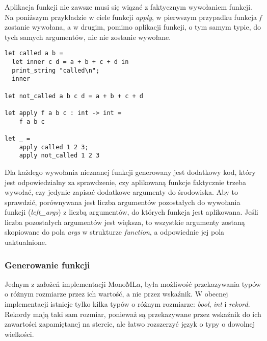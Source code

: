 \documentclass[declaration,shortabstract]{iithesis}
\begin{document}
Aplikacja funkcji nie zawsze musi się wiązać z faktycznym wywołaniem funkcji.
Na poniższym przykładzie w ciele funkcji \textit{apply},
w pierwszym przypadku funkcja \textit{f} zostanie wywołana, 
a w drugim, pomimo aplikacji funkcji, o tym samym typie, do tych samych 
argumentów, nic nie zostanie wywołane.
\begin{lstlisting}[frame=single, caption={To czy funkcja zostanie wywołana,
nie jest wiadome w czasie kompilacj. OCaml.}]
let called a b = 
  let inner c d = a + b + c + d in 
  print_string "called\n";
  inner 

let not_called a b c d = a + b + c + d 

let apply f a b c : int -> int = 
    f a b c 

let _ = 
    apply called 1 2 3;
    apply not_called 1 2 3
\end{lstlisting}

Dla każdego wywołania nieznanej funkcji generowany jest dodatkowy \newline
kod, który jest odpowiedzialny za sprawdzenie, czy aplikowaną funkcje 
faktycznie trzeba wywołać, czy jedynie zapisać dodatkowe argumenty do 
środowiska. Aby to sprawdzić, porównywana jest liczba argumentów pozostałych do 
wywołania funkcji (\textit{left\_args}) z liczbą argumentów, do których 
funkcja jest aplikowana.
Jeśli liczba pozostałych argumentów jest większa, to wszystkie argumenty 
zostaną skopiowane do pola \textit{args} w strukturze \textit{function}, a 
odpowiednie jej pola uaktualnione.










\subsubsection{Generowanie funkcji}

Jednym z założeń implementacji MonoMLa, była możliwość przekazywania typów
o różnym rozmiarze przez ich wartość, a nie przez wskaźnik. W obecnej 
implementacji istnieje tylko kilka typów o różnym rozmiarze: \textit{bool},
\textit{int} i \textit{rekord}. Rekordy mają taki sam rozmiar, ponieważ są 
przekazywane przez wskaźnik do ich zawartości zapamiętanej na stercie, ale 
łatwo rozszerzyć język o typy o dowolnej wielkości. 
\end{document}

